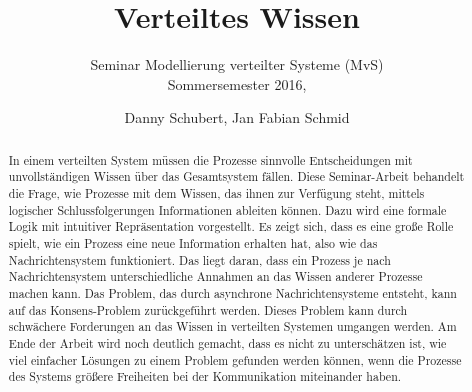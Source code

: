 \documentclass{llncs}
\begin{document}
\title{Verteiltes Wissen}
\subtitle{\small{ Seminar Modellierung verteilter Systeme (MvS)\\ Sommersemester 2016,}}
\author{Danny Schubert, Jan Fabian Schmid\\}
\maketitle
\pagestyle{plain}


\begin{abstract}
In einem verteilten System müssen die Prozesse sinnvolle Entscheidungen mit unvollständigen Wissen über das Gesamtsystem fällen.
Diese Seminar-Arbeit behandelt die Frage, wie Prozesse mit dem Wissen, das ihnen zur Verfügung steht, mittels logischer Schlussfolgerungen Informationen ableiten können.
Dazu wird eine formale Logik mit intuitiver Repräsentation vorgestellt.
Es zeigt sich, dass es eine große Rolle spielt, wie ein Prozess eine neue Information erhalten hat, also wie das Nachrichtensystem funktioniert. Das liegt daran, dass ein Prozess je nach Nachrichtensystem unterschiedliche Annahmen an das Wissen anderer Prozesse machen kann.
Das Problem, das durch asynchrone Nachrichtensysteme entsteht, kann auf das Konsens-Problem zurückgeführt werden.
Dieses Problem kann durch schwächere Forderungen an das Wissen in verteilten Systemen umgangen werden.
Am Ende der Arbeit wird noch deutlich gemacht, dass es nicht zu unterschätzen ist, wie viel einfacher Lösungen zu einem Problem gefunden werden können, wenn die Prozesse des Systems größere Freiheiten bei der Kommunikation miteinander haben.
\end{abstract}












\end{document}
